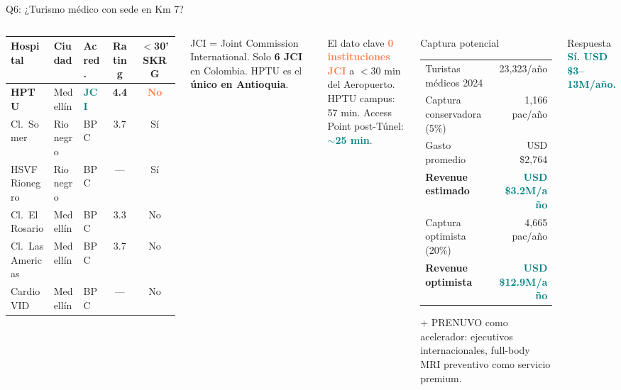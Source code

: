 \documentclass[aspectratio=169, 11pt]{beamer}
\newcommand{\highlight}[1]{\textcolor{teal}{\textbf{#1}}}
\newcommand{\danger}[1]{\textcolor{coral}{\textbf{#1}}}
\newcommand{\src}[1]{\par\vspace{2pt}{\tiny\textcolor{slate}{Fuente: #1}}}
\begin{document}
\begin{frame}{Q6: ¿Turismo médico con sede en Km 7?}
\begin{columns}[T]
{\tiny
\begin{tabular}{@{}lllcc@{}}
\toprule
\textbf{Hospital} & \textbf{Ciudad} & \textbf{Acred.} & \textbf{Rating} & \textbf{$<$30' SKRG} \\
\midrule
\rowcolor{teal!12}
\textbf{HPTU} & Medellín & \highlight{JCI} & \textbf{4.4} & \danger{No} \\
Cl.\ Somer & Rionegro & BPC & 3.7 & Sí \\
HSVF Rionegro & Rionegro & BPC & --- & Sí \\
Cl.\ El Rosario & Medellín & BPC & 3.3 & No \\
Cl.\ Las Americas & Medellín & BPC & 3.7 & No \\
CardioVID & Medellín & BPC & --- & No \\
\bottomrule
\end{tabular}
}

\vspace{4pt}
{\scriptsize JCI = Joint Commission International. Solo \textbf{6 JCI} en Colombia. HPTU es el \textbf{único en Antioquia}.}

\vspace{3pt}
\begin{alertblock}{\small El dato clave}
\scriptsize
\danger{0 instituciones JCI} a $<$30 min del Aeropuerto.\\
HPTU campus: 57 min. Access Point post-Túnel: \highlight{$\sim$25 min}.
\end{alertblock}

\begin{exampleblock}{\small Captura potencial}
\footnotesize
\begin{tabular}{@{}lr@{}}
Turistas médicos 2024 & 23,323/año \\
Captura conservadora (5\%) & 1,166 pac/año \\
Gasto promedio & USD \$2,764 \\
\midrule
\textbf{Revenue estimado} & \highlight{USD \$3.2M/año} \\
\midrule
Captura optimista (20\%) & 4,665 pac/año \\
\textbf{Revenue optimista} & \highlight{USD \$12.9M/año} \\
\bottomrule
\end{tabular}

\vspace{3pt}
+ PRENUVO como acelerador: ejecutivos internacionales, full-body MRI preventivo como servicio premium.
\end{exampleblock}

\vspace{4pt}
\begin{exampleblock}{\small Respuesta}
\centering\large
\highlight{Sí. USD \$3--13M/año.}
\end{exampleblock}
\end{columns}
\src{ProColombia, JCI Directory, Google Places, Mapbox Directions}
\end{frame}
\end{document}
